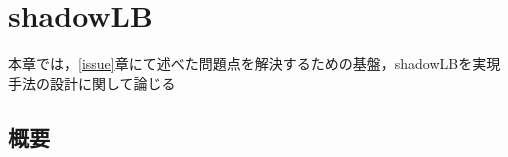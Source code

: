 \chapter{shadowLB}
\label{proposal}

本章では，\ref{issue}章にて述べた問題点を解決するための基盤，shadowLBを実現手法の設計に関して論じる


\section{概要}










